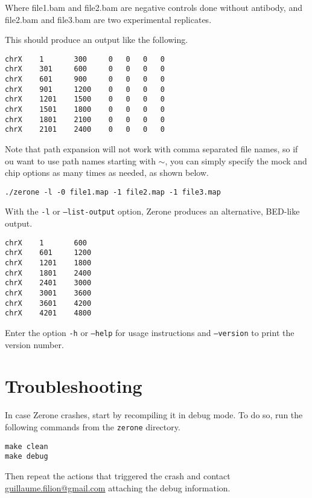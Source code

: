 \documentclass[12pt]{article}
\begin{document}
Where file1.bam and file2.bam are negative controls done without antibody,
and file2.bam and file3.bam are two experimental replicates.

This should produce an output like the following.

\begin{verbatim}
chrX    1       300     0   0   0   0
chrX    301     600     0   0   0   0
chrX    601     900     0   0   0   0
chrX    901     1200    0   0   0   0
chrX    1201    1500    0   0   0   0
chrX    1501    1800    0   0   0   0
chrX    1801    2100    0   0   0   0
chrX    2101    2400    0   0   0   0
\end{verbatim}

Note that path expansion will not work with comma separated file names, so if
ou want to use path names starting with $\sim$, you can simply
specify the mock and chip options as many times as needed, as shown below.

\begin{verbatim}
./zerone -l -0 file1.map -1 file2.map -1 file3.map
\end{verbatim}

\pagebreak%
With the \texttt{-l} or \texttt{--list-output} option, Zerone produces an
alternative, BED-like output.

\begin{verbatim}
chrX    1       600
chrX    601     1200
chrX    1201    1800
chrX    1801    2400
chrX    2401    3000
chrX    3001    3600
chrX    3601    4200
chrX    4201    4800
\end{verbatim}


Enter the option \texttt{-h} or \texttt{--help} for usage instructions and
\texttt{--version} to print the version number.

\section{Troubleshooting}

In case Zerone crashes, start by recompiling it in debug mode. To do so,
run the following commands from the \texttt{zerone} directory.

\begin{verbatim}
make clean
make debug
\end{verbatim}

Then repeat the actions that triggered the crash and contact
\href{mailto:guillaume.filion@gmail.com}{guillaume.filion@gmail.com}
attaching the debug information.

\end{document}
